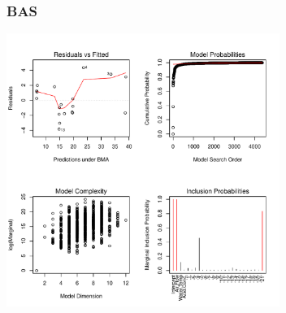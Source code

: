 \documentclass[]{beamer}
\begin{document}
\begin{frame}  \frametitle{BAS}

    \centerline{\includegraphics[height=3.5in]{BAS-stackloss}}
  \end{frame}
\end{document}
